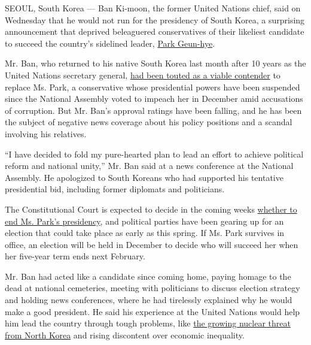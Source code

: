 SEOUL, South Korea --- Ban Ki-moon, the former United Nations chief,
said on Wednesday that he would not run for the presidency of South
Korea, a surprising announcement that deprived beleaguered conservatives
of their likeliest candidate to succeed the country's sidelined leader,
\href{https://www.nytimes.com/topic/person/park-geunhye?inline=nyt-per}{Park
Geun-hye}.

Mr. Ban, who returned to his native South Korea last month after 10
years as the United Nations secretary general,
\href{https://www.nytimes.com/2017/01/25/world/asia/ban-ki-moon-south-korea-president.html}{had
been touted as a viable contender} to replace Ms. Park, a conservative
whose presidential powers have been suspended since the National
Assembly voted to impeach her in December amid accusations of
corruption. But Mr. Ban's approval ratings have been falling, and he has
been the subject of negative news coverage about his policy positions
and a scandal involving his relatives.

``I have decided to fold my pure-hearted plan to lead an effort to
achieve political reform and national unity,'' Mr. Ban said at a news
conference at the National Assembly. He apologized to South Koreans who
had supported his tentative presidential bid, including former diplomats
and politicians.

The Constitutional Court is expected to decide in the coming weeks
\href{https://www.nytimes.com/2016/12/22/world/asia/south-korea-president-park-impeachment.html}{whether
to end Ms. Park's presidency}, and political parties have been gearing
up for an election that could take place as early as this spring. If Ms.
Park survives in office, an election will be held in December to decide
who will succeed her when her five-year term ends next February.

Mr. Ban had acted like a candidate since coming home, paying homage to
the dead at national cemeteries, meeting with politicians to discuss
election strategy and holding news conferences, where he had tirelessly
explained why he would make a good president. He said his experience at
the United Nations would help him lead the country through tough
problems, like
\href{https://www.nytimes.com/2017/01/09/world/asia/north-korea-trump-icbm-test.html?rref=collection\%2Ftimestopic\%2FNuclear\%20Weapons\&action=click\&contentCollection=science\&region=stream\&module=stream_unit\&version=search\&contentPlacement=4\&pgtype=collection}{the
growing nuclear threat from North Korea} and rising discontent over
economic inequality.

